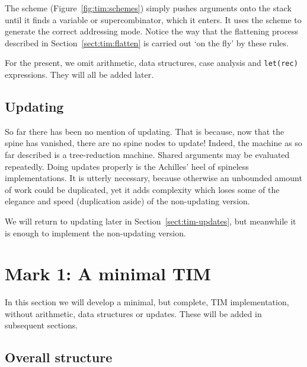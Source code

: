 The \tR{} scheme (Figure~\ref{fig:tim:schemes})
simply pushes arguments onto the stack until it finds
a variable or supercombinator, which it enters.
It uses the \tA{} scheme to generate the
correct addressing mode.  Notice the way that the flattening
process
described in Section~\ref{sect:tim:flatten} is carried out `on the fly'
by these rules.

For the present, we omit arithmetic, data structures, case
analysis and \mbox{\tt let(rec)} expressions.
They will all be added later.

\subsection{Updating}

So far there has been no mention of updating.
That is because, now that
the spine has vanished, there are no spine nodes to update!
Indeed, the machine as so far described is a tree-reduction machine.
Shared arguments may be evaluated repeatedly.
Doing updates properly is the Achilles' heel of
spineless implementations.  It is utterly necessary, because otherwise
an unbounded amount of work could be duplicated,
yet it adds complexity
which loses some of the elegance and speed (duplication aside)
of the non-updating version.

We will return to updating later in Section~\ref{sect:tim-updates},
but meanwhile it is enough to implement the non-updating version.

\section{Mark 1: A minimal TIM}
\label{minimal-tim}

In this section we will develop a minimal, but complete, TIM implementation,
without arithmetic, data structures or updates.  These will be added
in subsequent sections.

\subsection{Overall structure}

